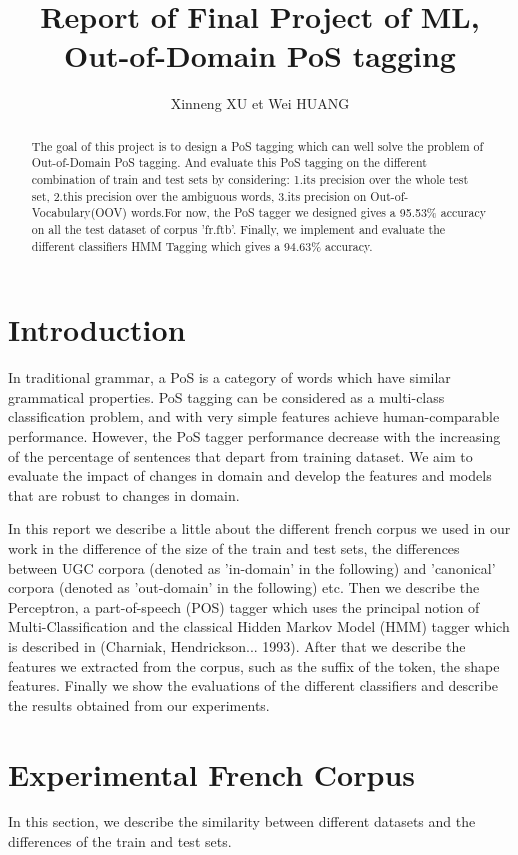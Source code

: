 \documentclass{article}
\title{Report of Final Project of ML, Out-of-Domain PoS tagging}
\author{Xinneng XU et Wei HUANG}
\begin{document}
\maketitle

\begin{abstract}
The goal of this project is to design a PoS tagging which can well solve the problem of Out-of-Domain PoS tagging. And evaluate this PoS tagging on the different combination of train and test sets by considering: 1.its precision over the whole test set, 2.this precision over the ambiguous words, 3.its precision on Out-of-Vocabulary(OOV) words.For now, the PoS tagger we designed gives a 95.53\% accuracy on all the test dataset of corpus 'fr.ftb'. Finally, we implement and evaluate the different classifiers HMM Tagging which gives a 94.63\% accuracy.
\end{abstract}


\section{Introduction}
In traditional grammar, a PoS is a category of words which have similar grammatical properties. PoS tagging can be considered as a multi-class classification problem, and with very simple features achieve human-comparable performance. However, the PoS tagger performance decrease with the increasing of the percentage of sentences that depart from training dataset. We aim to evaluate the impact of changes in domain and develop the features and models that are robust to changes in domain.

In this report we describe a little about the different french corpus we used in our work in the difference of the size of the train and test sets, the differences between UGC corpora (denoted as 'in-domain' in the following) and 'canonical' corpora (denoted as 'out-domain' in the following) etc. Then we describe the Perceptron, a part-of-speech (POS) tagger which uses the principal notion of Multi-Classification and the classical Hidden Markov Model (HMM) tagger which is described in (Charniak, Hendrickson... 1993). After that we describe the features we extracted from the corpus, such as the suffix of the token, the shape features. Finally we show the evaluations of the different classifiers and describe the results obtained from our experiments.


\section{Experimental French Corpus}
In this section, we describe the similarity between different datasets and the differences of the train and test sets.
\end{document}
